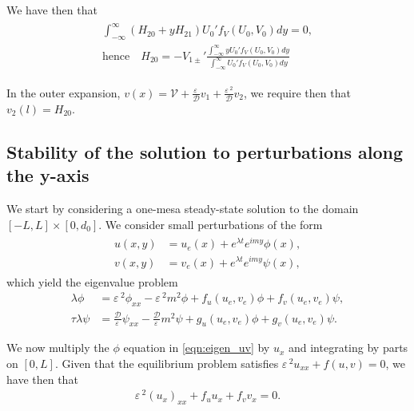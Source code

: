 \documentclass[a4paper,10pt]{article}
\newcommand{\lA}{\ensuremath{\lambda}}
\newcommand{\Ep}{\ensuremath{\varepsilon\,}}
\newcommand{\DD}{\ensuremath{\mathcal{D}}}
\newcommand{\VV}{\ensuremath{\mathcal{V}}}
\begin{document}
We have then that
% 
\begin{equation*}
\begin{split}
\begin{aligned}
  \int_{-\infty}^{\infty}(H_{20}+yH_{21})U_0'f_V(U_0,V_0)dy = 0,\\
	\text{hence}\quad H_{20} = -V_{1\pm}'\frac{\int_{-\infty}^{\infty}yU_0'f_V(U_0,V_0)dy}{\int_{-\infty}^{\infty}U_0'f_V(U_0,V_0)dy}
\end{aligned}
\end{split}
\end{equation*}
% 

In the outer expansion, $v(x) = \VV + \frac{\Ep}{\DD}v_1 + \frac{\Ep^2}{\DD}v_2$, we require then that $v_2(l) = H_{20}$.


\subsection{Stability of the solution to perturbations along the y-axis}


We start by considering a one-mesa steady-state solution to the domain $[-L,L]\times[0,d_0]$. We consider small perturbations of the form
% 
\begin{equation*}
\begin{split}
\begin{aligned}
  u(x,y) &= u_e(x) + e^{\lA t}e^{imy}\phi(x),\\
  v(x,y) &= v_e(x) + e^{\lA t}e^{imy}\psi(x),
\end{aligned}
\end{split}
\end{equation*}
% 
which yield the eigenvalue problem
% 
\begin{equation}
\label{eqn:eigen_uv}
\begin{split}
  \lA \phi &= \Ep^2\phi_{xx} - \Ep^2m^2\phi + f_u(u_e,v_e)\phi + f_v(u_e,v_e)\psi,\\
  \tau\lA \psi &= \frac{\DD}{\Ep}\psi_{xx} - \frac{\DD}{\Ep}m^2\psi + g_u(u_e,v_e)\phi + g_v(u_e,v_e)\psi.
\end{split}
\end{equation}
% 


We now multiply the $\phi$ equation in \eqref{eqn:eigen_uv} by $u_x$ and integrating by parts on $[0,L]$. Given that the equilibrium problem satisfies $\Ep^2u_{xx} + f(u,v) = 0$, we have then that
% 
\begin{equation*}
\begin{aligned}
	\Ep^2(u_x)_{xx} + f_uu_x + f_vv_x = 0.
\end{aligned}
\end{equation*}
% 
\end{document}
